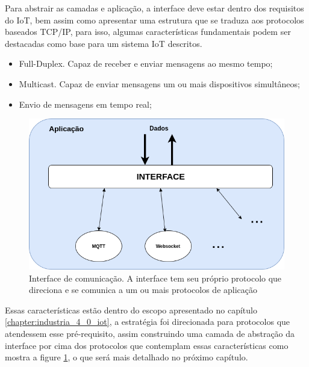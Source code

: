 Para abstrair as camadas e aplicação, a interface deve estar dentro dos requisitos do IoT, bem assim como apresentar uma estrutura que se traduza aos protocolos baseados TCP/IP, para isso, algumas características fundamentais podem ser destacadas como base para um sistema IoT descritos.

\begin{itemize}

\item Full-Duplex. Capaz de receber e enviar mensagens ao mesmo tempo;
\item Multicast. Capaz de enviar mensagens um ou mais dispositivos simultâneos;
\item Envio de mensagens em tempo real;

\end{itemize}


\begin{figure}[h!]
\centering
\includegraphics[width=12cm]{./02_Capitulos/02_Cap2/figures/camada_abstracao}
\caption{Interface de comunicação. A interface tem seu próprio protocolo que direciona e se comunica a um ou mais protocolos de aplicação}
\label{fig:2.2.0/camada_abatracao}
\end{figure}

Essas características estão dentro do escopo apresentado no capítulo \ref{chapter:industria_4_0_iot}, a estratégia foi direcionada para protocolos que atendessem esse pré-requisito, assim construindo uma camada de abstração da interface por cima dos protocolos que contemplam essas características como mostra a figure \ref{fig:2.2.0/camada_abatracao}, o que será mais detalhado no próximo capítulo.


